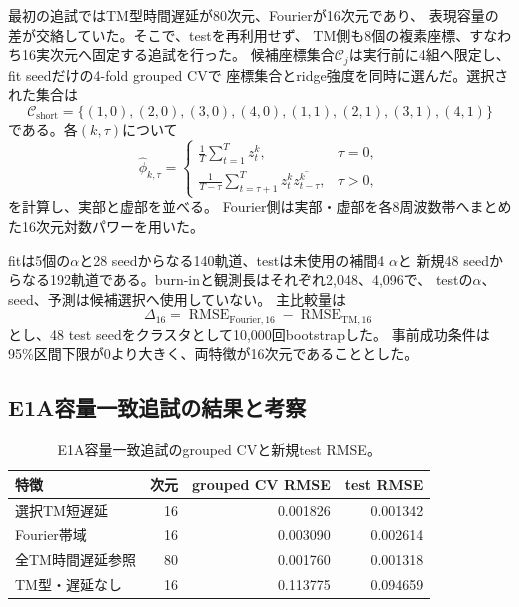 \documentclass[a4paper,11pt]{jlreq}
\DeclareMathOperator{\RMSE}{RMSE}
\begin{document}
最初の追試ではTM型時間遅延が80次元、Fourierが16次元であり、
表現容量の差が交絡していた。そこで、testを再利用せず、
TM側も8個の複素座標、すなわち16実次元へ固定する追試を行った。
候補座標集合$\mathcal C_j$は実行前に4組へ限定し、fit seedだけの4-fold grouped CVで
座標集合とridge強度を同時に選んだ。選択された集合は
\begin{equation}
    \mathcal C_{\mathrm{short}}
    =\{(1,0),(2,0),(3,0),(4,0),
       (1,1),(2,1),(3,1),(4,1)\}
    \label{eq:matched-tm-coordinates}
\end{equation}
である。各$(k,\tau)$について
\begin{equation}
    \widehat\phi_{k,\tau}
    =\begin{cases}
      \displaystyle \frac{1}{T}\sum_{t=1}^{T}z_t^k,
        & \tau=0,\\[6pt]
      \displaystyle \frac{1}{T-\tau}
      \sum_{t=\tau+1}^{T}z_t^k\overline{z_{t-\tau}^k},
        & \tau>0,
    \end{cases}
    \label{eq:matched-tm-feature}
\end{equation}
を計算し、実部と虚部を並べる。
Fourier側は実部・虚部を各8周波数帯へまとめた16次元対数パワーを用いた。

fitは5個の$\alpha$と28 seedからなる140軌道、testは未使用の補間4 $\alpha$と
新規48 seedからなる192軌道である。burn-inと観測長はそれぞれ2,048、4,096で、
testの$\alpha$、seed、予測は候補選択へ使用していない。
主比較量は
\begin{equation}
    \Delta_{16}
    =\RMSE_{\mathrm{Fourier},16}
     -\RMSE_{\mathrm{TM},16}
\end{equation}
とし、48 test seedをクラスタとして10,000回bootstrapした。
事前成功条件は95\%区間下限が0より大きく、両特徴が16次元であることとした。

\subsection{E1A容量一致追試の結果と考察}

\begin{table}[htbp]
\centering
\small
\caption{E1A容量一致追試のgrouped CVと新規test RMSE。}
\label{tab:e1-matched-results}
\begin{tabular}{lrrr}
\toprule
特徴 & 次元 & grouped CV RMSE & test RMSE \\
\midrule
選択TM短遅延 & 16 & 0.001826 & 0.001342 \\
Fourier帯域 & 16 & 0.003090 & 0.002614 \\
全TM時間遅延参照 & 80 & 0.001760 & 0.001318 \\
TM型・遅延なし & 16 & 0.113775 & 0.094659 \\
\bottomrule
\end{tabular}
\end{table}
\end{document}
